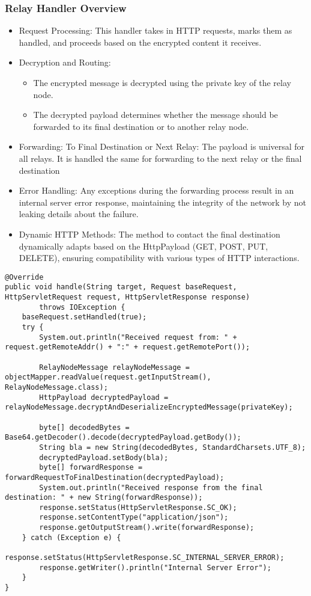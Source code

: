 \documentclass[sigconf]{acmart}
\begin{document}
\subsubsection{Relay Handler Overview}
\begin{itemize}
    \item Request Processing: This handler takes in HTTP requests, marks them as handled, and proceeds based on the encrypted content it receives.
    \item Decryption and Routing:
    \begin{itemize}
        \item The encrypted message is decrypted using the private key of the relay node.
        \item The decrypted payload determines whether the message should be forwarded to its final destination or to another relay node.
    \end{itemize}
    \item Forwarding:
        To Final Destination or Next Relay: The payload is universal for all relays. It is handled the same for forwarding to the next relay or the final destination
    \item Error Handling: Any exceptions during the forwarding process result in an internal server error response, maintaining the integrity of the network by not leaking details about the failure.
    \item Dynamic HTTP Methods: The method to contact the final destination dynamically adapts based on the HttpPayload (GET, POST, PUT, DELETE), ensuring compatibility with various types of HTTP interactions.
\end{itemize}
\begin{lstlisting}[caption=The Routing Algorithm]
@Override
public void handle(String target, Request baseRequest, HttpServletRequest request, HttpServletResponse response)
        throws IOException {
    baseRequest.setHandled(true);
    try {
        System.out.println("Received request from: " + request.getRemoteAddr() + ":" + request.getRemotePort());

        RelayNodeMessage relayNodeMessage = objectMapper.readValue(request.getInputStream(), RelayNodeMessage.class);
        HttpPayload decryptedPayload = relayNodeMessage.decryptAndDeserializeEncryptedMessage(privateKey);
        
        byte[] decodedBytes = Base64.getDecoder().decode(decryptedPayload.getBody());
        String bla = new String(decodedBytes, StandardCharsets.UTF_8);
        decryptedPayload.setBody(bla);
        byte[] forwardResponse = forwardRequestToFinalDestination(decryptedPayload);
        System.out.println("Received response from the final destination: " + new String(forwardResponse));
        response.setStatus(HttpServletResponse.SC_OK);
        response.setContentType("application/json");
        response.getOutputStream().write(forwardResponse);
    } catch (Exception e) {
        response.setStatus(HttpServletResponse.SC_INTERNAL_SERVER_ERROR);
        response.getWriter().println("Internal Server Error");
    }
}
\end{lstlisting}
\end{document}
